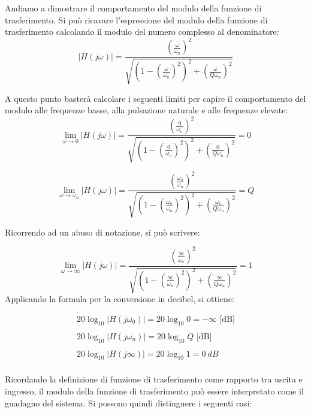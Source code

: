 Andiamo a dimostrare il comportamento del modulo della funzione di trasferimento. Si può ricavare l'espressione del modulo della funzione di trasferimento calcolando il modulo del numero complesso al denominatore:
\begin{equation}
    |H(j\omega)| = \frac{\left(\frac{\omega}{\omega_n}\right)^2}{\sqrt{\left(1-\left(\frac{\omega}{\omega_n}\right)^2\right)^2 + \left(\frac{\omega}{Q\omega_n}\right)^2}}
\end{equation}


A questo punto basterà calcolare i seguenti limiti per capire il comportamento del modulo alle frequenze basse, alla pulsazione naturale e alle frequenze elevate:
\begin{equation}
    \lim_{\omega \to 0} |H(j\omega)| = \frac{\left(\frac{0}{\omega_n}\right)^2}{\sqrt{\left(1-\left(\frac{0}{\omega_n}\right)^2\right)^2 + \left(\frac{0}{Q\omega_n}\right)^2}} = 0
\end{equation}

\begin{equation}
    \lim_{\omega \to \omega_n} |H(j\omega)| = \frac{\left(\frac{\omega_n}{\omega_n}\right)^2}{\sqrt{\left(1-\left(\frac{\omega_n}{\omega_n}\right)^2\right)^2 + \left(\frac{\omega_n}{Q\omega_n}\right)^2}} = Q
\end{equation}

Ricorrendo ad un abuso di notazione, si può scrivere:

\begin{equation}
    \lim_{\omega \to \infty} |H(j\omega)| = \frac{\left(\frac{\infty}{\omega_n}\right)^2}{\sqrt{\left(1-\left(\frac{\infty}{\omega_n}\right)^2\right)^2 + \left(\frac{\infty}{Q\omega_n}\right)^2}} = 1
\end{equation}
Applicando la formula per la conversione in decibel, si ottiene:

\begin{equation}
    \begin{aligned}
    20\log_{10} |H(j\omega_0)| =  20\log_{10} 0 = -\infty \text{ [dB]}\\\\
    20\log_{10} |H(j\omega_n)| = 20\log_{10} Q \text{ [dB]} \\\\
    20\log_{10} |H(j\infty)| = 20\log_{10} 1 = \SI{0}{dB}\\
    \end{aligned}
\end{equation}

Ricordando la definizione di funzione di trasferimento come rapporto tra uscita e ingresso, 
il modulo della funzione di trasferimento può essere interpretato come il guadagno del sistema. 
Si possono quindi distinguere i seguenti casi:

